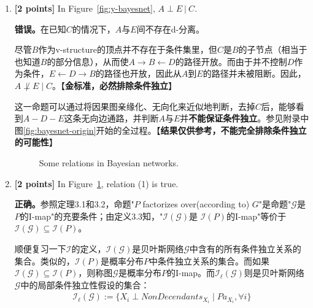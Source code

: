 \documentclass[12pt]{article}
\newcommand{\Gcal}{\mathcal{G}}
\newcommand{\Ical}{\mathcal{I}}
\begin{document}
\begin{enumerate}
	\item \textbf{[2 points]} In Figure~\ref{fig:y-bayesnet}, $ A \perp E \ | \ C $.

	      \begin{solution}
		      \textbf{错误。}在已知$C$的情况下，$A$与$E$间不存在d-分离。

		      尽管$B$作为v-structure的顶点并不存在于条件集里，但$C$是$B$的子节点（相当于也知道$B$的部分信息），从而使$A \rightarrow B \leftarrow D$的路径开放。而由于并不控制$D$作为条件，$E \leftarrow D \rightarrow B$的路径也开放，因此从$A$到$E$的路径并未被阻断。因此，$A \not \perp E \mid C$。【\textbf{金标准，必然排除条件独立}】

		      这一命题可以通过将因果图亲缘化、无向化来近似地判断，去掉$C$后，能够看到$A-D-E$这条无向边通路，并判断$A$与$E$并\textbf{不能保证条件独立}。参见附录中图\ref{fig:bayesnet-origin}开始的全过程。【\textbf{结果仅供参考，不能完全排除条件独立的可能性}】
	      \end{solution}



	      \begin{figure}[h]
		      \centering
		      \caption{Some relations in Bayesian networks.}
		      \label{fig:relations-bayesnet}
	      \end{figure}



	\item \textbf{[2 points]} In Figure~\ref{fig:relations-bayesnet}, relation (1) is true.
	      \begin{solution}
		      \textbf{正确。}参照定理3.1和3.2，命题"$P$ factorizes over(according to) $G$"是命题"$\Gcal$是 $P$的I-map"的充要条件；由定义3.3知，"$\Ical(\Gcal)$是 $\Ical(P)$的I-map"等价于$\Ical(\Gcal) \subseteq \Ical(P)$。

		      顺便复习一下$\Ical$的定义，$\Ical(\Gcal)$是贝叶斯网络$\Gcal$中含有的所有条件独立关系的集合。类似的，$\Ical(P)$是概率分布$P$中条件独立关系的集合。而如果$\Ical(\Gcal) \subseteq \Ical(P)$，则称图$\Gcal$是概率分布$P$的I-map。而$\Ical_{\ell}(\Gcal)$则是贝叶斯网络$\Gcal$中的局部条件独立性假设的集合：
		      \begin{align*}
			      \Ical_{\ell}(\Gcal) := \{X_{i} \perp NonDecendants_{X_i} \mid Pa_{X_i} , \forall i\}
		      \end{align*}


\end{solution}
\end{enumerate}
\end{document}
